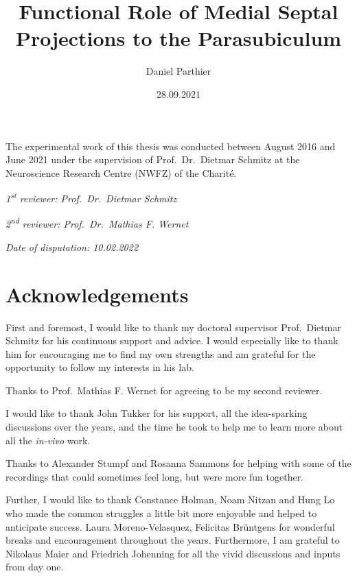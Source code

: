 \documentclass[
  12pt,
  a4paper,
  openany]{book}
\title{Functional Role of Medial Septal Projections to the Parasubiculum}
\subtitle{~\\
\hspace*{0.333em}\\
\hspace*{0.333em}\\
\hspace*{0.333em}\\
\hspace*{0.333em}\\
Inaugural-Dissertation\\
to obtain the academic degree\\
Doctor rerum naturalium (Dr.~rer. nat.)\\
\strut \\
submitted to the Department of Biology, Chemistry, Pharmacy\\
of Freie Universität Berlin\\
by}
\author{Daniel Parthier}
\date{28.09.2021}
\begin{document}
\maketitle

\newpage

\vspace*{\fill}

\noindent
The experimental work of this thesis was conducted between August 2016 and June 2021 under the supervision of Prof.~Dr.~Dietmar Schmitz at the Neuroscience Research Centre (NWFZ) of the Charité.
\vspace*{\fill}

\emph{1\textsuperscript{st} reviewer: Prof.~Dr.~Dietmar Schmitz}

\emph{2\textsuperscript{nd} reviewer: Prof.~Dr.~Mathias F. Wernet}

\vspace{1cm}
\hspace{0pt}

\emph{Date of disputation: 10.02.2022}
\hspace{0pt}
\clearpage

\hypertarget{acknowledgements}{%
\chapter*{Acknowledgements}\label{acknowledgements}}

First and foremost, I would like to thank my doctoral supervisor Prof.~Dietmar Schmitz for his continuous support and advice. I would especially like to thank him for encouraging me to find my own strengths and am grateful for the opportunity to follow my interests in his lab.

Thanks to Prof.~Mathias F. Wernet for agreeing to be my second reviewer.

I would like to thank John Tukker for his support, all the idea-sparking discussions over the years, and the time he took to help me to learn more about all the \emph{in-vivo} work.

Thanks to Alexander Stumpf and Rosanna Sammons for helping with some of the recordings that could sometimes feel long, but were more fun together.

Further, I would like to thank Constance Holman, Noam Nitzan and Hung Lo who made the common struggles a little bit more enjoyable and helped to anticipate success. Laura Moreno-Velasquez, Felicitas Brüntgens for wonderful breaks and encouragement throughout the years. Furthermore, I am grateful to Nikolaus Maier and Friedrich Johenning for all the vivid discussions and inputs from day one.
\end{document}
